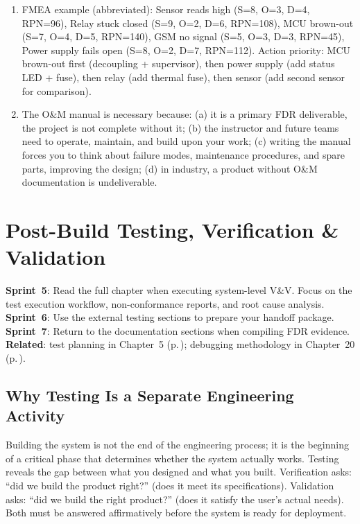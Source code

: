 \documentclass[11pt,letterpaper,twoside,openany]{book}
\begin{document}
\begin{enumerate}[leftmargin=1.5em]
\item FMEA example (abbreviated): Sensor reads high (S=8, O=3, D=4, RPN=96), Relay stuck closed (S=9, O=2, D=6, RPN=108), MCU brown-out (S=7, O=4, D=5, RPN=140), GSM no signal (S=5, O=3, D=3, RPN=45), Power supply fails open (S=8, O=2, D=7, RPN=112). Action priority: MCU brown-out first (decoupling + supervisor), then power supply (add status LED + fuse), then relay (add thermal fuse), then sensor (add second sensor for comparison).
\item The O\&M manual is necessary because: (a) it is a primary FDR deliverable, the project is not complete without it; (b) the instructor and future teams need to operate, maintain, and build upon your work; (c) writing the manual forces you to think about failure modes, maintenance procedures, and spare parts, improving the design; (d) in industry, a product without O\&M documentation is undeliverable.
\end{enumerate}



\chapter{Post-Build Testing, Verification \& Validation}\label{ch:postbuild}

\begin{tipbox}
\textbf{Sprint~5}: Read the full chapter when executing system-level V\&V. Focus on the test execution workflow, non-conformance reports, and root cause analysis. \textbf{Sprint~6}: Use the external testing sections to prepare your handoff package. \textbf{Sprint~7}: Return to the documentation sections when compiling FDR evidence. \textbf{Related}: test planning in Chapter~5 (p.\,\pageref{ch:vv}); debugging methodology in Chapter~20 (p.\,\pageref{ch:debug}).
\end{tipbox}

\section{Why Testing Is a Separate Engineering Activity}
Building the system is not the end of the engineering process; it is the beginning of a critical phase that determines whether the system actually works. Testing reveals the gap between what you designed and what you built. Verification asks: ``did we build the product right?'' (does it meet its specifications). Validation asks: ``did we build the right product?'' (does it satisfy the user's actual needs). Both must be answered affirmatively before the system is ready for deployment.
\end{document}

